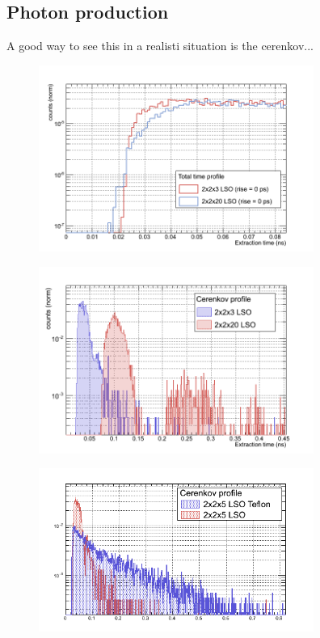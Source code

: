 \subsection{Photon production}
A good way to see this in a realisti situation is the cerenkov...

\begin{figure}[htbp]
\begin{center}
\includegraphics[width=9cm]{../Pictures/Chapter_6/tot_3_20.png}
\end{center}
\caption[]{}
\label{fig:scint_3_20}
\end{figure}

\begin{figure}[htbp]
\begin{center}
\includegraphics[width=9cm]{../Pictures/Chapter_6/cerenkov_collected.png}
\end{center}
\caption[]{}
\label{fig:cer_coll}
\end{figure}

\begin{figure}[htbp]
\begin{center}
\includegraphics[width=9cm]{../Pictures/Chapter_6/cerenkov_teflon_nt.png}
\end{center}
\caption[]{}
\label{fig:cer_tefl}
\end{figure}


